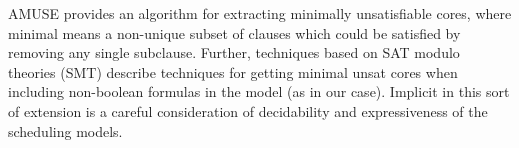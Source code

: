 AMUSE\cite{sat:amuse} provides an algorithm for extracting minimally unsatisfiable cores, where minimal means a non-unique subset of clauses which could be satisfied by removing any single subclause.  Further, techniques based on SAT modulo theories (SMT) describe techniques for getting minimal unsat cores when including non-boolean formulas in the model\cite{sat:smtcore} (as in our case).  Implicit in this sort of extension is a careful consideration of decidability and expressiveness of the scheduling models.
